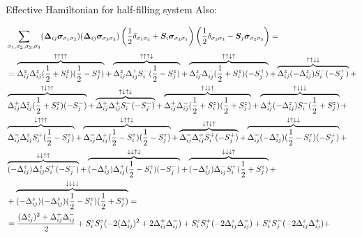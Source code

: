 \begin{section}{Effective Hamiltonian for half-filling system}
Also:

\begin{align*}
&\sum_{\sigma_1, \sigma_2, \sigma_3, \sigma_4} (\bs{\Delta}_{ij}\bs{\sigma}_{\sigma_1 \sigma_2})(\bs{\Delta}_{ij} \bs{\sigma}_{\sigma_3 \sigma_4})\left(\frac{1}{2}\delta_{\sigma_1 \sigma_4} + \bs{S}_i\bs{\sigma}_{\sigma_4 \sigma_1}\right)\left(\frac{1}{2}\delta_{\sigma_2 \sigma_3}-\bs{S}_j\bs{\sigma}_{\sigma_2 \sigma_3}\right) = \\
&= \overbrace{\Delta_{ij}^z\Delta_{ij}^z(\frac{1}{2}+S_i^z)(\frac{1}{2}-S_j^z)}^{\uparrow \uparrow \uparrow \uparrow} +
	\overbrace{\Delta_{ij}^z\Delta_{ij}^+S_i^-(\frac{1}{2}-S_j^z)}^{\uparrow \uparrow \uparrow \downarrow} +
	\overbrace{\Delta_{ij}^z\Delta_{ij}^-(\frac{1}{2}+ S_i^z)(-S_j^+)}^{\uparrow \uparrow \downarrow \uparrow} +
	\overbrace{\Delta_{ij}^z(-\Delta_{ij}^z) S_i^-(-S_j^+)}^{\uparrow \uparrow \downarrow \downarrow} + \\
	&\overbrace{\Delta_{ij}^+\Delta_{ij}^z (\frac{1}{2}+S_i^z)(-S_j^-)}^{\uparrow \downarrow \uparrow \uparrow} +
	\overbrace{\Delta_{ij}^+\Delta_{ij}^+S_i^-(-S_j^-)}^{\uparrow \downarrow \uparrow \downarrow} +
	\overbrace{\Delta_{ij}^+\Delta_{ij}^-(\frac{1}{2}+S_i^z)(\frac{1}{2}+S_j^z)}^{\uparrow \downarrow \downarrow \uparrow} +
	\overbrace{\Delta_{ij}^+(-\Delta_{ij}^z) S_i^-(\frac{1}{2}+S_j^z)}^{\uparrow \downarrow \downarrow \downarrow} + \\
	&\overbrace{\Delta_{ij}^-\Delta_{ij}^z S_i^+(\frac{1}{2}-S_j^z)}^{\downarrow \uparrow \uparrow \uparrow} +
	\overbrace{\Delta_{ij}^-\Delta_{ij}^+(\frac{1}{2}-S_i^z)(\frac{1}{2}-S_j^z)}^{\downarrow \uparrow \uparrow \downarrow} +
	\overbrace{\Delta_{ij}^-\Delta_{ij}^-S_i^+(-S_j^+)}^{\downarrow \uparrow \downarrow \uparrow} +
	\overbrace{\Delta_{ij}^-(-\Delta_{ij}^z) (\frac{1}{2} - S_i^z) (-S_j^+)}^{\downarrow \uparrow \downarrow \downarrow} + \\
	& \overbrace{(-\Delta_{ij}^z)\Delta_{ij}^z S_i^+(-S_j^-)}^{\downarrow \downarrow \uparrow \uparrow} +
	\overbrace{(-\Delta_{ij}^z)\Delta_{ij}^+ (\frac{1}{2}-S_i^z)(-S_j^-)}^{\downarrow \downarrow \uparrow \downarrow} +
	\overbrace{(-\Delta_{ij}^z)\Delta_{ij}^- S_i^+(\frac{1}{2}+S_j^z)}^{\downarrow \downarrow \downarrow \uparrow} + \\
	&+\overbrace{(-\Delta_{ij}^z)(-\Delta_{ij}^z)(\frac{1}{2}-S_i^z)(\frac{1}{2}+S_j^z)}^{\downarrow \downarrow \downarrow \downarrow} = \\
&= \frac{(\Delta_{ij}^z)^2+\Delta_{ij}^+\Delta_{ij}^-}{2} + S_i^zS_j^z (-2(\Delta_{ij}^z)^2 + 2\Delta_{ij}^+\Delta_{ij}^-) + S_i^zS_j^+(-2\Delta_{ij}^z\Delta_{ij}^-) + S_i^zS_j^-(-2\Delta_{ij}^z\Delta_{ij}^+) +\\ 

\end{align*}
\end{section}
